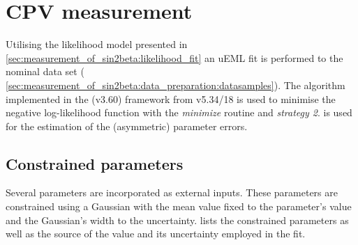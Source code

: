 
\section{CPV measurement}
\label{sec:measurement_of_sin2beta:cpv_measurement}

Utilising the likelihood model presented in
\cref{sec:measurement_of_sin2beta:likelihood_fit} an \acf{uEML} fit is performed
to the nominal data set (\cf
\cref{sec:measurement_of_sin2beta:data_preparation:datasamples}).  The
\MinuitTwo algorithm implemented in the \RooFit (v3.60) framework from \ROOT
v5.34/18 is used to minimise the negative log-likelihood function with the
\emph{minimize} routine and \emph{strategy 2}. \Minos is used for the estimation
of the (asymmetric) parameter errors.

\subsection{Constrained parameters}
\label{sec:measurement_of_sin2beta:cpv_measurement:constrained_parameters}

Several parameters are incorporated as external inputs. These parameters are
constrained using a Gaussian \PDF with the mean value fixed to the parameter's
value and the Gaussian's width to the uncertainty.
 lists
the constrained parameters as well as the source of the value and its
uncertainty employed in the fit.

